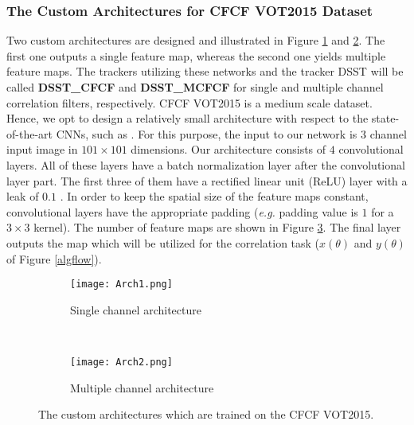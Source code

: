 \documentclass[journal]{IEEEtran}
\begin{document}
\subsubsection{The Custom Architectures for CFCF VOT2015 Dataset}
Two custom architectures are designed and illustrated in Figure \ref{Arch1} and \ref{Arch2}. The first one outputs a single feature map, whereas the second one yields multiple feature maps. The trackers utilizing these networks and the tracker DSST \cite{DSST} will be called \textbf{DSST\_CFCF} and \textbf{DSST\_MCFCF} for single and multiple channel correlation filters, respectively. CFCF VOT2015 is a medium scale dataset. Hence, we opt to design a relatively small architecture with respect to the state-of-the-art CNNs, such as \cite{VGG}. For this purpose, the input to our network is $3$ channel input image in $101\times 101$ dimensions. Our architecture consists of $4$ convolutional layers. All of these layers have a batch normalization layer after the convolutional layer part. The first three of them have a rectified linear unit (ReLU) \cite{ImageNetCNN} layer with a leak of $0.1$ \cite{prelu, prelu2}. In order to keep the spatial size of the feature maps constant, convolutional layers have the appropriate padding (\emph{e.g.} padding value is $1$ for a $3 \times 3$ kernel). The number of feature maps are shown in Figure \ref{ourarch}. The final layer outputs the map which will be utilized for the correlation task ($x(\theta)$ and $y(\theta)$ of Figure \ref{algflow}).
\begin{figure}
\begin{subfigure}{1\linewidth}
  \centering
  \texttt{[image: Arch1.png]}
  \caption{Single channel architecture}
  \label{Arch1}
\end{subfigure}\\
\begin{subfigure}{1.0\linewidth}
  \centering
  \texttt{[image: Arch2.png]}
  \caption{Multiple channel architecture}
  \label{Arch2}
\end{subfigure}
\caption{The custom architectures which are trained on the CFCF VOT2015.}
\label{ourarch}
\end{figure}
\end{document}
